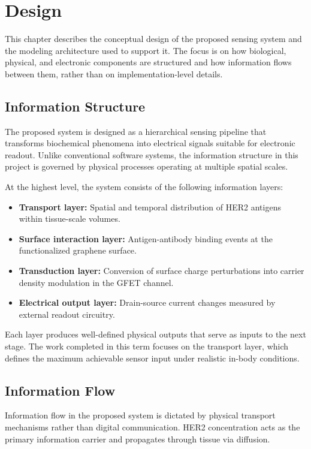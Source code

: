 \documentclass[12pt,a4paper]{report}
\begin{document}
\chapter{Design}

This chapter describes the conceptual design of the proposed sensing system and the modeling architecture used to support it. The focus is on how biological, physical, and electronic components are structured and how information flows between them, rather than on implementation-level details.

\section{Information Structure}

The proposed system is designed as a hierarchical sensing pipeline that transforms biochemical phenomena into electrical signals suitable for electronic readout. Unlike conventional software systems, the information structure in this project is governed by physical processes operating at multiple spatial scales.

At the highest level, the system consists of the following information layers:

\begin{itemize}
    \item \textbf{Transport layer:} Spatial and temporal distribution of HER2 antigens within tissue-scale volumes.
    \item \textbf{Surface interaction layer:} Antigen-antibody binding events at the functionalized graphene surface.
    \item \textbf{Transduction layer:} Conversion of surface charge perturbations into carrier density modulation in the GFET channel.
    \item \textbf{Electrical output layer:} Drain-source current changes measured by external readout circuitry.
\end{itemize}

Each layer produces well-defined physical outputs that serve as inputs to the next stage. The work completed in this term focuses on the transport layer, which defines the maximum achievable sensor input under realistic in-body conditions.

\section{Information Flow}

Information flow in the proposed system is dictated by physical transport mechanisms rather than digital communication. HER2 concentration acts as the primary information carrier and propagates through tissue via diffusion.
\end{document}
